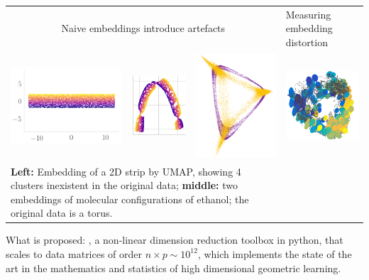 \documentclass[floatfix,11pt]{article}
\begin{document}
\begin{tabular}{llll}
\multicolumn{3}{c}{Naive embeddings introduce artefacts}
&
Measuring embedding distortion
\\
\includegraphics[width=1.7in]{Figures/D1_original_data.png} &
\includegraphics[width=0.8in]{Figures/umap_mindist_comp.png} &
\includegraphics[width=1.2in,angle=90]{Figures/geometric_vs_normalized.png}
&
\includegraphics[width=1.2in]{Figures/aspirin-postclu1-phi234Rmetric-tau22.png}
\\
\multicolumn{3}{l}{\parbox{4.7in}{{\bf Left:} Embedding of a 2D strip by UMAP, showing 4 clusters inexistent in the original data; {\bf middle:} two embeddings of molecular configurations of ethanol; the original data is a torus.}}\\
\end{tabular}

What is proposed: \gmani, a non-linear dimension reduction toolbox
in python, that scales to data matrices of order $n\times p \sim
10^{12}$, which implements the state of the art in the mathematics and
statistics of high dimensional geometric learning.
\end{document}

